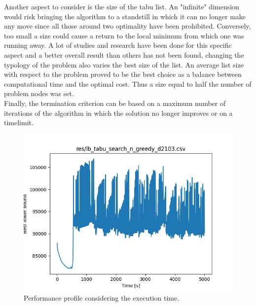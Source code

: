 Another aspect to consider is the size of the tabu list. An "infinite" dimension would risk bringing the algorithm to a standstill in which it can no longer make any move since all those around two optimality have been prohibited. Conversely, too small a size could cause a return to the local minimum from which one was running away. A lot of studies and research have been done for this specific aspect \cite{Nababan_2019, Tsubakitani1998} and a better overall result than others has not been found, changing the typology of the problem also varies the best size of the list. An average list size with respect to the problem proved to be the best choice as a balance between computational time and the optimal cost. Thus a size equal to half the number of problem nodes was set.\\
Finally, the termination criterion can be based on a maximum number of iterations of the algorithm in which the solution no longer improves or on a timelimit.

\begin{figure}[h]
	\centering
	\includegraphics[width=.70\columnwidth]{../res/lb_tabu_search_n_greedy_d2103.png}
	\caption{Performance profile considering the execution time.}
	\label{fig:tabu_search_perform_time}
\end{figure}

